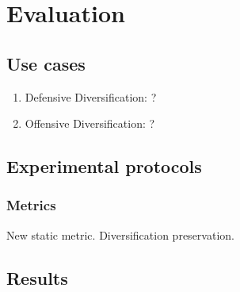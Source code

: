 \chapter{Evaluation}
\label{method}


\newcommand{\rqfour}{Defensive Diversification: ?}
\newcommand{\rqfive}{Offensive Diversification: ?}

\section{Use cases}

\begin{enumerate}[label=RQ\arabic*:, ref=RQ\arabic*]
	\item \rqfour
	\item \rqfive
\end{enumerate}

\section{Experimental protocols}

\subsection{Metrics}

New static metric. Diversification preservation.

\section{Results}
